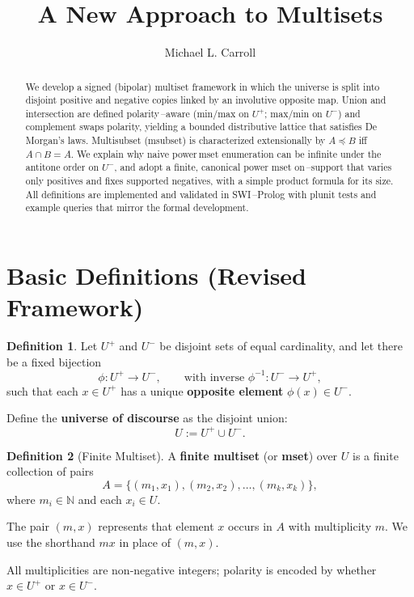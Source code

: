 \documentclass{article}
\theoremstyle{plain}
\theoremstyle{definition}
\newtheorem{definition}{Definition}
\theoremstyle{remark}
\newcommand{\Nat}{\mathbb{N}}
\begin{document}
\title{A New Approach to Multisets}
\author{Michael L. Carroll}
\maketitle
\begin{abstract}
We develop a signed (bipolar) multiset framework in which the universe is split into disjoint positive and negative copies linked by an involutive opposite map. Union and intersection are defined polarity\,--aware (min/max on $U^+$; max/min on $U^-$) and complement swaps polarity, yielding a bounded distributive lattice that satisfies De Morgan's laws. Multisubset (msubset) is characterized extensionally by $A \preceq B$ iff $A\cap B = A$. We explain why naive power\,mset enumeration can be infinite under the antitone order on $U^-$, and adopt a finite, canonical power mset on\,--support that varies only positives and fixes supported negatives, with a simple product formula for its size. All definitions are implemented and validated in SWI\,--Prolog with plunit tests and example queries that mirror the formal development.
\end{abstract}
	
\section*{Basic Definitions (Revised Framework)}

\begin{definition}
	Let \( U^{+} \) and \( U^{-} \) be disjoint sets of equal cardinality, and let there be a fixed bijection 
	\[
	\phi : U^{+} \to U^{-}, \qquad \text{with inverse } \phi^{-1} : U^{-} \to U^{+},
	\]
	such that each \( x \in U^{+} \) has a unique \textbf{opposite element} \( \phi(x) \in U^{-} \).
	
	Define the \textbf{universe of discourse} as the disjoint union:
	\[
	U := U^{+} \cup U^{-}.
	\]
\end{definition}

\begin{definition}[Finite Multiset]
	A \textbf{finite multiset} (or \textbf{mset}) over \( U \) is a finite collection of pairs 
	\[
	A = \{ (m_1,x_1), (m_2,x_2), \dots, (m_k,x_k) \},
	\]
	where \( m_i \in \Nat \) and each \( x_i \in U \).  
	
	The pair \( (m,x) \) represents that element \( x \) occurs in \( A \) with multiplicity \( m \).  
	We use the shorthand \( mx \) in place of \( (m,x) \).
	
	All multiplicities are non‑negative integers; polarity is encoded by whether \( x \in U^{+} \) or \( x \in U^{-} \).
\end{definition}
\end{document}

